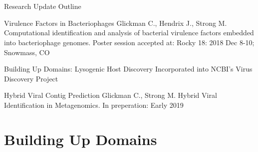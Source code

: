 \documentclass[11pt, xcolor=table]{beamer}
\begin{document}
	
\section{}
	\begin{frame}{Research Update Outline}
	\begin{block}{\textcolor{black!50}{Virulence Factors in Bacteriophages}}
	\textcolor{black!50}{\tiny{Glickman C., Hendrix J., Strong M. Computational identification and analysis of bacterial virulence factors embedded into bacteriophage genomes. Poster session accepted at: Rocky 18: 2018 Dec 8-10; Snowmass, CO}}
	\end{block}
	
	\begin{block}{Building Up Domains: Lysogenic Host Discovery}
  Incorporated into NCBI's Virus Discovery Project
	\end{block}

	\begin{block}{\textcolor{black!50}{Hybrid Viral Contig Prediction}}
	\textcolor{black!50}{\tiny{Glickman C., Strong M. Hybrid Viral Identification in Metagenomics. In preperation: Early 2019}}
	\end{block}
	\end{frame}
	
\section{Building Up Domains}
\subsection{}
	
\end{document}
